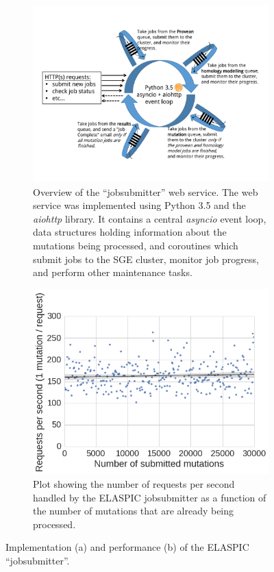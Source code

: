 \begin{figure}[!htb]
	\centering

	\begin{subfigure}{0.8\textwidth}
		\centering
		\includegraphics[width=1\linewidth]{static/elaspic/elaspic_jobsubmitter.pdf}
		\caption{Overview of the ``jobsubmitter'' web service. The web service was implemented using Python 3.5 and the \textit{aiohttp} library. It contains a central \textit{asyncio} event loop, data structures holding information about the mutations being processed, and coroutines which submit jobs to the SGE cluster, monitor job progress, and perform other maintenance tasks.}
		\label{fig:elaspic_jobsubmitter}
	\end{subfigure}
	\vspace*{10mm}

	\begin{subfigure}[t]{0.8\textwidth}
		\centering
		\includegraphics[width=0.7\linewidth]{static/elaspic/elaspic_jobsubmitter_performance.png}
		\caption{Plot showing the number of requests per second handled by the ELASPIC jobsubmitter as a function of the number of mutations that are already being processed.}
		\label{fig:elaspic_jobsubmitter_performance}
	\end{subfigure}
	\vspace*{5mm}

	\caption[ELASPIC jobsubmitter.]{
	Implementation (a) and performance (b) of the ELASPIC ``jobsubmitter''.
	}
	\label{fig:ELASPIC jobsubmitter}

\end{figure}



